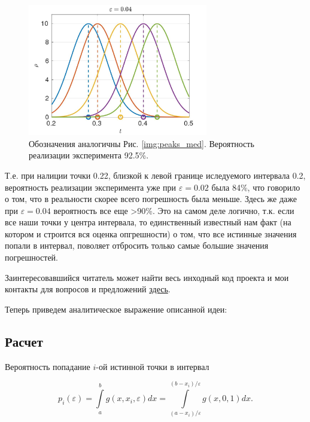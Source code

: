 \documentclass[a4paper,12pt]{article} %
\begin{document}
\begin{figure}[h!]
\begin{center}
\includegraphics[width=0.7\textwidth]{./pics/peaks_smooth}
\end{center}
\caption{Обозначения аналогичны Рис. \ref{img:peaks_med}. Вероятность реализации эксперимента 92.5\%.} \label{img:peaks_smooth}
\end{figure}

Т.е. при налиции точки 0.22, близкой к левой границе иследуемого интервала 0.2, вероятность реализации эксперимента уже при $\varepsilon = 0.02$ была 84\%, что говорило о том, что в реальности скорее всего погрешность была меньше. Здесь же даже при $\varepsilon = 0.04$ вероятность все еще >90\%. Это на самом деле логично, т.к. если все наши точки у центра интервала, то единственный известный нам факт (на котором и строится вся оценка опгрешности) о том, что все истинные значения попали в интервал, поволяет отбросить только самые большие значения погрешностей.

Заинтересовавшийся читатель может найти весь инходный код проекта и мои контакты для вопросов и предложений \href{https://github.com/PolyachenkoYA/errorEstimationIOGT}{здесь}.

Теперь приведем аналитическое выражение описанной идеи:

\newpage

\subsection{Расчет}

Вероятность попадание $i$-ой истинной точки в интервал

\begin{equation}
p_i(\varepsilon) = \int\limits_a^b g \left(x, x_i, \varepsilon \right) dx = \int\limits_{(a-x_i)/\varepsilon}^{(b-x_i)/\varepsilon} g(x, 0, 1) dx.
\end{equation}
\end{document}
